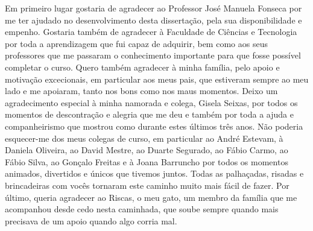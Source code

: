 \acknowledgements

Em primeiro lugar gostaria de agradecer ao Professor José Manuela Fonseca por me ter ajudado no desenvolvimento desta dissertação, pela sua disponibilidade e empenho.
Gostaria também de agradecer à Faculdade de Ciências e Tecnologia por toda a aprendizagem que fui capaz de adquirir, bem como aos seus professores que me passaram o conhecimento importante para que fosse possível completar o curso.
Quero também agradecer à minha família, pelo apoio e motivação excecionais, em particular aos meus pais, que estiveram sempre ao meu lado e me apoiaram, tanto nos bons como nos maus momentos.
Deixo um agradecimento especial à minha namorada e colega, Gisela Seixas, por todos os momentos de descontração e alegria que me deu e também por toda a ajuda e companheirismo que mostrou como durante estes últimos três anos.
Não poderia esquecer-me dos meus colegas de curso, em particular ao André Estevam, à Daniela Oliveira, ao David Mestre, ao Duarte Segurado, ao Fábio Carmo, ao Fábio Silva, ao Gonçalo Freitas e à Joana Barruncho por todos os momentos animados, divertidos e únicos que tivemos juntos. Todas as palhaçadas, risadas e brincadeiras com vocês tornaram este caminho muito mais fácil de fazer.
Por último, queria agradecer ao Riscas, o meu gato, um membro da família que me acompanhou desde cedo nesta caminhada, que soube sempre quando mais precisava de um apoio quando algo corria mal.